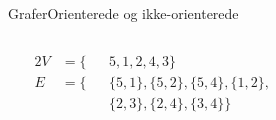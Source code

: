 \documentclass[aspectratio=1610]{beamer}
\begin{document}
\begin{frame}{Grafer}{Orienterede og ikke-orienterede}
\begin{columns}[t]
\begin{center}
        \end{center}
        \vspace{-\abovedisplayskip}
        \begin{alignat*}{2}
            V&= \{&& 5,1,2,4,3\} \\
            E&= \{&&\{5,1\},\{5,2\},\{5,4\},\{1,2\}, \\ & &&\{2,3\},\{2,4\},\{3,4\} \}
        \end{alignat*}

    \end{columns}
\end{frame}
\end{document}

